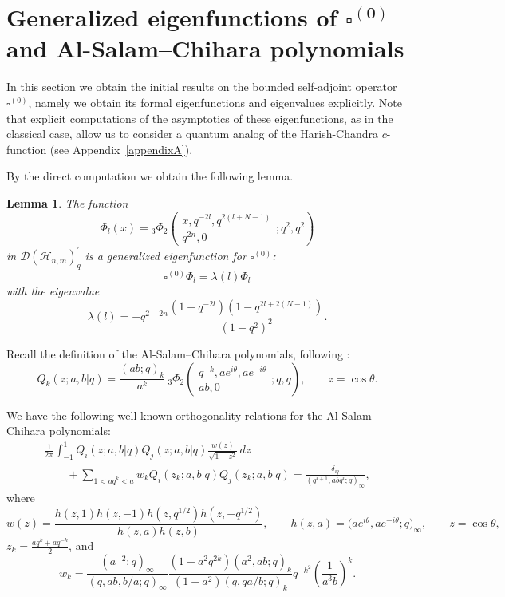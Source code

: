 \documentclass[11pt]{article}
\newtheorem{lemma}{Lemma}
\begin{document}
\section[Generalized eigenfunctions of $\square^{(0)}$ and Al-Salam-Chihara polynomials]{Generalized eigenfunctions of $\boldsymbol{\square^{(0)}}$\\ and Al-Salam--Chihara polynomials}\label{sec_7}

In this section we obtain the initial results on the bounded self-adjoint operator $\square^{(0)}$, namely we
obtain its formal eigenfunctions and eigenvalues explicitly. Note that explicit computations of the
asymptotics of these eigenfunctions, as in the classical case, allow us to consider a quantum analog of the
Harish-Chandra $c$-function (see Appendix~\ref{appendixA}).

By the direct computation we obtain the following lemma.

\begin{lemma}\label{c1.5.2} The function
\[
\Phi_l(x) = {_{3}\Phi_{2}}\left(
\begin{array}{c}
x,q^{-2l},q^{2(l+N-1)}\\ q^{2n},0
\end{array}
;q^2,q^2\right)
\]
in $\mathscr{D}(\mathscr{H}_{n,m})_q^\prime$ is a generalized eigenfunction for $\square^{(0)}$:
\[\square^{(0)} \Phi_l=\lambda(l)\Phi_l\] with the eigenvalue
\[
\lambda(l) = - q^{2-2n}\frac{(1-q^{-2l})(1-q^{2l+2(N-1)})}{(1-q^2)^2}.
\]
\end{lemma}



Recall the def\/inition of the Al-Salam--Chihara polynomials, following \cite{koekoek}:
\[
Q_k(z;a,b|q)=\frac{(ab;q)_k}{a^k}\ {_{3}\Phi_{2}}\left(
\begin{array}{c}
q^{-k},a e^{i\theta},ae^{-i\theta}\\ ab,0
\end{array}
;q,q\right), \qquad z=\cos\theta.
\]

We have the following well known orthogonality relations for the Al-Salam--Chihara polynomials:
\begin{gather}
\frac{1}{2\pi}\int_{-1}^1 Q_i(z;a,b|q)Q_j(z;a,b|q)\frac{w(z)}{\sqrt{1-z^2}}\,dz\nonumber\\
\qquad{}+\sum_{1<aq^k<a}w_k Q_i(z_k;a,b|q)Q_j(z_k;a,b|q)=\frac{\delta_{ij}}{(q^{i+1},abq^i;q)_\infty},\label{rel_orth_ASC}
\end{gather}
where
\[
w(z)=\frac{h(z,1)h(z,-1)h(z,q^{1/2})h(z,-q^{1/2})}{h(z,a)h(z,b)}, \!\!\qquad
h(z,a)=\big(ae^{i\theta},ae^{-i\theta};q\big)_{\infty},\!\! \qquad z=\cos\theta,
\]
$z_k=\frac{aq^k+aq^{-k}}{2}$, and
\[
w_k=\frac{(a^{-2};q)_\infty}{(q,ab,b/a;q)_\infty}\frac{(1-a^2q^{2k})(a^2,ab;q)_k}
{(1-a^2)(q,qa/b;q)_k}q^{-k^2}\left(\frac{1}{a^3b}\right)^k.
\]
\end{document}

